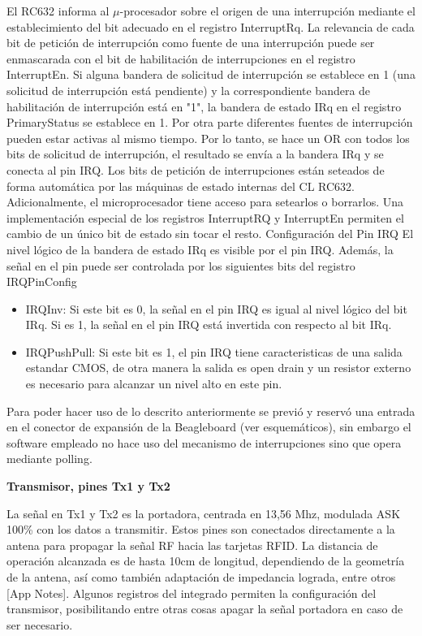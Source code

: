 El RC632 informa al $\mu$-procesador sobre el origen de una interrupción mediante el establecimiento del bit adecuado en el registro InterruptRq. La relevancia de cada bit de petición de interrupción como fuente de una interrupción puede ser enmascarada con el bit de habilitación de interrupciones en el registro InterruptEn. 
Si alguna bandera de solicitud de interrupción se establece en 1 (una solicitud de interrupción está pendiente) y la correspondiente bandera de habilitación de interrupción está en "1", la bandera de estado IRq en el registro PrimaryStatus se establece en 1. 
Por otra parte diferentes fuentes de interrupción pueden estar activas al mismo tiempo. Por lo tanto, se hace un OR con todos los bits de solicitud de interrupción, el resultado se envía a la bandera IRq y se conecta al pin IRQ. 
Los bits de petición de interrupciones están seteados de forma automática por las máquinas de estado internas del CL RC632. Adicionalmente, el microprocesador tiene acceso para setearlos o borrarlos. 
Una implementación especial de los registros InterruptRQ y InterruptEn permiten el cambio de un único bit de estado sin tocar el resto. 
Configuración del Pin IRQ 
El nivel lógico de la bandera de estado IRq es visible por el pin IRQ. Además, la señal en el pin puede ser controlada por los siguientes bits del registro IRQPinConfig 
\begin{itemize}
\item IRQInv: 	   Si este bit es 0, la señal en el pin IRQ es igual al nivel lógico del bit IRq. 
		  	   Si es 1, la señal en el pin IRQ está invertida con respecto al bit IRq. 
\item IRQPushPull:  Si este bit es 1, el pin IRQ tiene caracteristicas de una salida estandar 				   CMOS, de otra manera la salida es open drain y un resistor externo es 				   necesario para alcanzar un nivel alto en este pin. 
\end{itemize}

Para poder hacer uso de lo descrito anteriormente se previó y reservó una entrada en el conector de expansión de la Beagleboard (ver esquemáticos), sin embargo el software empleado no hace uso del mecanismo de interrupciones sino que opera mediante polling.


{\bf{Transmisor, pines Tx1 y Tx2}}

La señal en Tx1 y Tx2 es la portadora, centrada en 13,56 Mhz, modulada ASK 100\% con los datos a transmitir. Estos pines son conectados directamente a la antena para propagar la señal RF hacia las tarjetas RFID. La distancia de operación alcanzada es de hasta 10cm de longitud, dependiendo de la geometría de la antena, así como también adaptación de impedancia lograda, entre otros [App Notes].
Algunos registros del integrado permiten la configuración del transmisor, posibilitando entre otras cosas apagar la señal portadora en caso de ser necesario.

